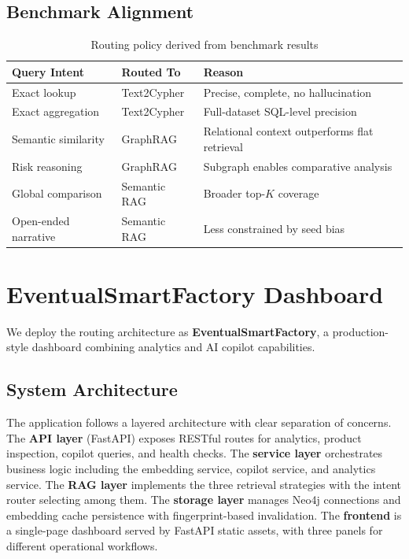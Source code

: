 \documentclass[11pt,a4paper]{article}
\begin{document}
\subsection{Benchmark Alignment}

\begin{table}[H]
\centering
\caption{Routing policy derived from benchmark results}
\label{tab:routing}
\scriptsize
\begin{tabularx}{\linewidth}{>{\raggedright\arraybackslash}p{2cm} >{\raggedright\arraybackslash}p{1.8cm} >{\raggedright\arraybackslash}X}
\toprule
\textbf{Query Intent} & \textbf{Routed To} & \textbf{Reason} \\
\midrule
Exact lookup & Text2Cypher & Precise, complete, no hallucination \\
Exact aggregation & Text2Cypher & Full-dataset SQL-level precision \\
Semantic similarity & GraphRAG & Relational context outperforms flat retrieval \\
Risk reasoning & GraphRAG & Subgraph enables comparative analysis \\
Global comparison & Semantic RAG & Broader top-$K$ coverage \\
Open-ended narrative & Semantic RAG & Less constrained by seed bias \\
\bottomrule
\end{tabularx}
\end{table}

\section{EventualSmartFactory Dashboard}

We deploy the routing architecture as \textbf{EventualSmartFactory}, a production-style dashboard combining analytics and AI copilot capabilities.

\subsection{System Architecture}

The application follows a layered architecture with clear separation of concerns. The \textbf{API layer} (FastAPI) exposes RESTful routes for analytics, product inspection, copilot queries, and health checks. The \textbf{service layer} orchestrates business logic including the embedding service, copilot service, and analytics service. The \textbf{RAG layer} implements the three retrieval strategies with the intent router selecting among them. The \textbf{storage layer} manages Neo4j connections and embedding cache persistence with fingerprint-based invalidation. The \textbf{frontend} is a single-page dashboard served by FastAPI static assets, with three panels for different operational workflows.
\end{document}
